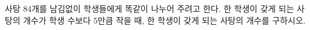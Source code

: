 사탕 $84$개를 남김없이 학생들에게 똑같이 나누어 주려고 한다. 한 학생이 갖게 되는 사탕의 개수가 학생 수보다 $5$만큼 작을 때, 한 학생이 갖게 되는 사탕의 개수를 구하시오.
